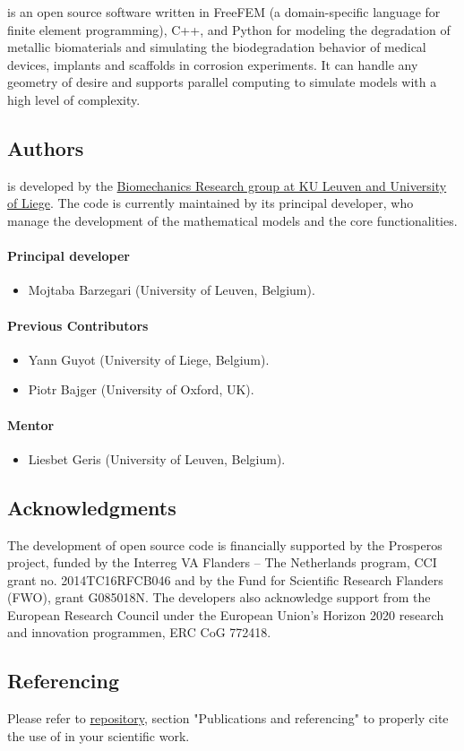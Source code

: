 \biodeg{} is an open source software written in FreeFEM (a domain-specific language for finite element programming), C++, and Python for modeling the degradation of metallic biomaterials and simulating the biodegradation behavior of medical devices, implants and scaffolds in corrosion experiments. It can handle any geometry of desire and supports parallel computing to simulate models with a high level of complexity.

\subsection{Authors}
\label{sec:authors}
\biodeg{} is developed by the \href{http://www.biomech.ulg.ac.be/}{Biomechanics Research group at KU Leuven and University of Liege}. The code is currently maintained by its principal developer, 
who manage the development of the mathematical models and the core functionalities. 

\paragraph{Principal developer}
\begin{itemize}
	\item Mojtaba Barzegari (University of Leuven, Belgium).
\end{itemize}

\paragraph{Previous Contributors}
\begin{itemize}
	\item Yann Guyot (University of Liege, Belgium).
	\item Piotr Bajger (University of Oxford, UK).
\end{itemize}

\paragraph{Mentor}
\begin{itemize}
	\item Liesbet Geris (University of Leuven, Belgium).
\end{itemize}

\subsection{Acknowledgments}
The development of \biodeg{} open source code is financially supported by the Prosperos project, funded by the Interreg VA Flanders – The Netherlands program, CCI grant no. 2014TC16RFCB046 and by the Fund for Scientific Research Flanders (FWO), grant G085018N. The developers also acknowledge support from the European Research Council under the European Union's Horizon 2020 research and innovation programmen, ERC CoG 772418.

\subsection{Referencing \biodeg{}}

Please refer to \href{https://github.com/mbarzegary/BioDeg}{\biodeg{} repository}, section "Publications and referencing" to properly cite the use of 
\biodeg{} in your scientific work. 

